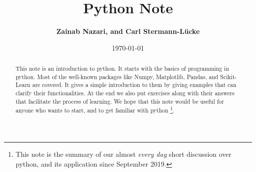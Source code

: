 \documentclass[10pt,a4paper]{article}
\author{\textbf{Zainab Nazari, and Carl Stermann-L\"ucke}}
\title{\huge\textbf{Python Note}}
\date{\today}
\begin{document}
\maketitle
\begin{abstract}
    This note is an introduction to python. It starts with the basics of programming in python. Most of the well-known packages like Numpy, Matplotlib, Pandas, and Scikit-Learn are covered. It gives a simple introduction to them by giving  examples that can  clarify their functionalities. At the end we also put exercises along with their answers that  facilitate the process of learning. We hope that this note would be useful for anyone who wants to start, and to get familiar with python \footnote{This note is the summary of our almost \textit{every day} short discussion over python, and its application since September 2019.}. 
\end{abstract}
\pagebreak
\tableofcontents
\end{document}
